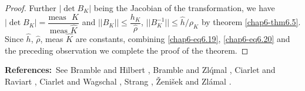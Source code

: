 \begin{proof}
Further $|\det B_{K}|$ being the Jacobian of the transformation, we
have $|\det B_{K}|=\dfrac{\text{meas~ }K}{\text{meas~}\hat{K}}$ and
$||B_{K}||\leq \dfrac{h_{K}}{\hat{\rho}}$, $||B^{-1}_{K}||\leq
\hat{h}/\rho_{K}$ by theorem \ref{chap6-thm6.5}. Since $\hat{h}$,
$\hat{\rho}$, meas $\hat{K}$ are constants, combining
\eqref{chap6-eq6.19}, \eqref{chap6-eq6.20} and the preceding
observation we complete the proof of the theorem.
\end{proof}

\noindent
{\bf References:}~See Bramble and Hilbert \cite{key28}, Bramble and
Zl\'qmal \cite{key2}, Ciarlet and Raviart \cite{key7}, Ciarlet and
Wagschal \cite{key8}, Strang \cite{key21}, \v{Z}eni\v{s}ek
\cite{key23,key24} and Zl\'amal \cite{key25,key32}. 

